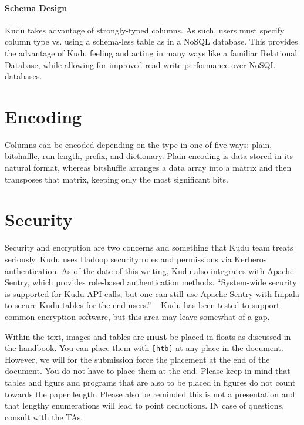 \paragraph{Schema Design} 
Kudu takes advantage of strongly-typed columns. As such, users must specify column type vs. using a schema-less table as in a NoSQL database.  This provides the advantage of Kudu feeling and acting in many ways like a familiar Relational Database, while allowing for improved read-write performance over NoSQL databases. ~\cite{hid-sp18-407-kudu-schema-design}

\section{Encoding} 
Columns can be encoded depending on the type in one of five ways: plain, bitshuffle, run length, prefix, and dictionary. Plain encoding is data stored in its natural format, whereas bitshuffle arranges a data array into a matrix and then transposes that matrix, keeping only the most significant bits. ~\cite{hid-sp18-407-bitshuffle}

\section{Security} 
Security and encryption are two concerns and something that Kudu team treats seriously. Kudu uses Hadoop security roles and permissions via Kerberos authentication. As of the date of this writing, Kudu also integrates with Apache Sentry, which provides role-based authentication methods.  ``System-wide security is supported for Kudu API calls, but one can still use Apache Sentry with Impala to secure Kudu tables for the end users.'' ~\cite{hid-sp18-407-benchmarking-kudu} Kudu has been tested to support common encryption software, but this area may leave somewhat of a gap. 






Within the text, images and tables are {\bf must} be placed in floats
as discussed in the handbook. You can place them with \verb|[htb]| at
any place in the document. However, we will for the submission force
the placement at the end of the document. You do not have to place
them at the end. Please keep in mind that tables and figurs and
programs that are also to be placed in figures do not count towards
the paper length. Please also be reminded this is not a presentation
and that lengthy enumerations will lead to point deductions. IN case
of questions, consult with the TAs.

